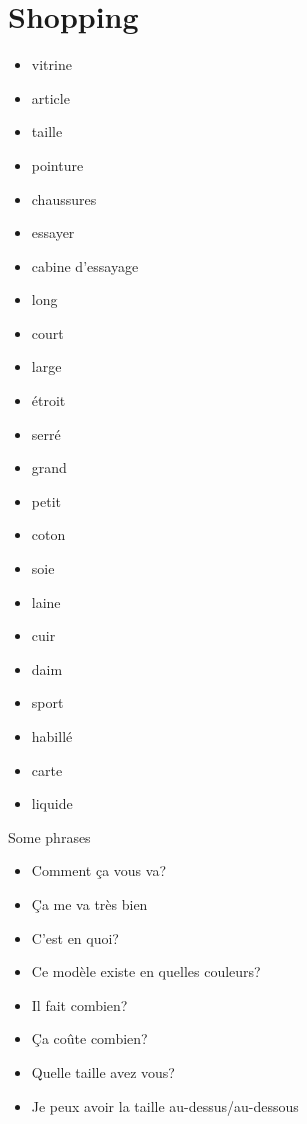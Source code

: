 \documentclass[palatino]{nicenotes}
\begin{document}
\section{Shopping}

\begin{multicols}{3}
\begin{itemize}
\item vitrine
\item article
\item taille
\item pointure
\item chaussures
\item essayer
\item cabine d'essayage
\item long
\item court
\item large
\item étroit
\item serré
\item grand
\item petit
\item coton
\item soie
\item laine
\item cuir
\item daim
\item sport
\item habillé
\item carte
\item liquide
\end{itemize}
\end{multicols}

Some phrases

\begin{multicols}{2}
\begin{itemize}
\item Comment ça vous va?
\item Ça me va très bien
\item C'est en quoi?
\item Ce modèle existe en quelles couleurs?
\item Il fait combien?
\item Ça co\^ute combien?
\item Quelle taille avez vous?
\item Je peux avoir la taille au-dessus/au-dessous
\end{itemize}
\end{multicols}
\end{document}
